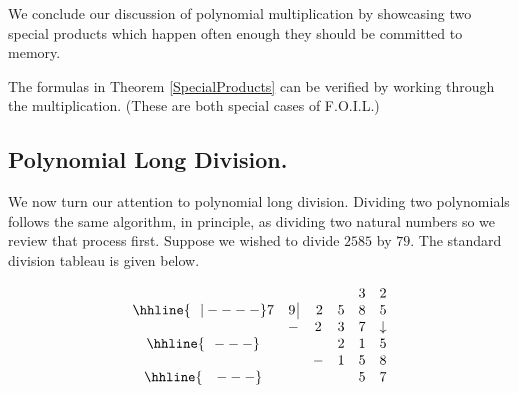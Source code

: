 We conclude our discussion of polynomial multiplication by showcasing two special products which happen often enough they should be committed to memory.

\medskip


\medskip

The formulas in Theorem \ref{SpecialProducts} can be verified by working through the multiplication. (These are both special cases of F.O.I.L.)

\subsection{Polynomial Long Division.}
\label{polylongdiv}

We now turn our attention to polynomial long division.  Dividing two polynomials follows the same algorithm, in principle, as dividing two natural numbers so we review that process first.  Suppose we wished to divide $2585$ by $79$.  The standard division tableau is given below. 

\setlength\arraycolsep{0.1pt}
\setlength\extrarowheight{2pt}

\[ \begin{array}{cccccc}

    &             &      &    & 3   & 2  \\ \hhline{~~|----}

  7 & 9 \, \vline & \, 2 & 5 & 8 & 5  \\

    &            -&    2 & 3 & 7 & \downarrow \\ \hhline{~~---} 
    &             &      & 2 & 1 &  5   \\ 
    &             &     - & 1 & 5 & 8    \\ \hhline{~~~---} 
    &             &      &   & 5 & 7    \\

 
\end{array}\]

